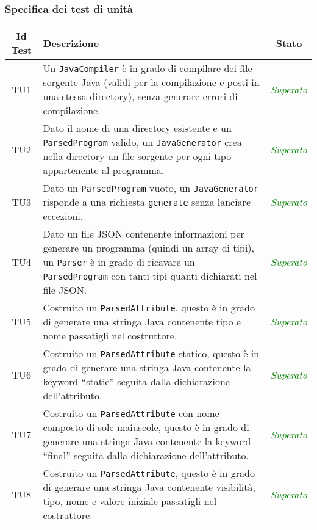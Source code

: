 \subsubsection{Specifica dei test di unità} \label{sec:spec_tu}
\normalsize
\begin{longtable}{|c|>{}m{8cm}|c|}
\hline
\textbf{Id Test} & \textbf{Descrizione} & \textbf{Stato}\\
\hline
\endhead
\hypertarget{TU1}{TU1} & Un \texttt{JavaCompiler} è in grado di compilare dei file sorgente Java (validi per la compilazione e posti in una stessa directory), senza generare errori di compilazione. & \textcolor{Green}{\textit{Superato}}\\ \hline
\hypertarget{TU2}{TU2} & Dato il nome di una directory esistente e un \texttt{ParsedProgram} valido, un \texttt{JavaGenerator} crea nella directory un file sorgente per ogni tipo appartenente al programma. & \textcolor{Green}{\textit{Superato}}\\ \hline
\hypertarget{TU3}{TU3} & Dato un \texttt{ParsedProgram} vuoto, un \texttt{JavaGenerator} risponde a una richiesta \texttt{generate} senza lanciare eccezioni. & \textcolor{Green}{\textit{Superato}}\\ \hline
\hypertarget{TU4}{TU4} & Dato un file JSON contenente informazioni per generare un programma (quindi un array di tipi), un \texttt{Parser} è in grado di ricavare un \texttt{ParsedProgram} con tanti tipi quanti dichiarati nel file JSON. & \textcolor{Green}{\textit{Superato}}\\ \hline
\hypertarget{TU5}{TU5} & Costruito un \texttt{ParsedAttribute}, questo è in grado di generare una stringa Java contenente tipo e nome passatigli nel costruttore. & \textcolor{Green}{\textit{Superato}}\\ \hline
\hypertarget{TU6}{TU6} & Costruito un \texttt{ParsedAttribute} statico, questo è in grado di generare una stringa Java contenente la keyword ``static'' seguita dalla dichiarazione dell'attributo. & \textcolor{Green}{\textit{Superato}}\\ \hline
\hypertarget{TU7}{TU7} & Costruito un \texttt{ParsedAttribute} con nome composto di sole maiuscole, questo è in grado di generare una stringa Java contenente la keyword ``final'' seguita dalla dichiarazione dell'attributo. & \textcolor{Green}{\textit{Superato}}\\ \hline
\hypertarget{TU8}{TU8} & Costruito un \texttt{ParsedAttribute}, questo è in grado di generare una stringa Java contenente visibilità, tipo, nome e valore iniziale passatigli nel costruttore. & \textcolor{Green}{\textit{Superato}}\\ \hline

\end{longtable}
